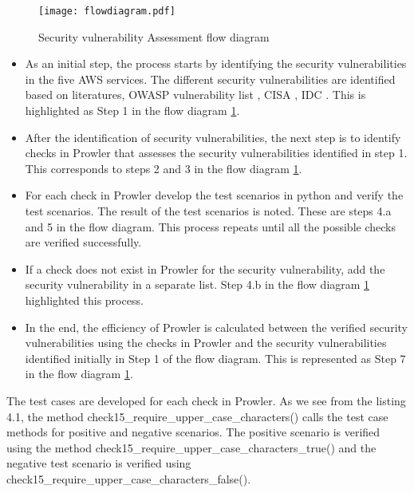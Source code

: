 \begin{figure}
    \centering
    \texttt{[image: flowdiagram.pdf]}
    \caption{Security vulnerability Assessment flow diagram}
    \label{fig:flowdiagram}
\end{figure}
\begin{itemize}
    \item As an initial step, the process starts by identifying the security vulnerabilities in the five AWS services.
    The different security vulnerabilities are identified based on literatures, OWASP vulnerability list \cite{43}, CISA \cite{42}, IDC \cite{41}.
    This is highlighted as Step 1 in the flow diagram \ref{fig:flowdiagram}.
\end{itemize}
\begin{itemize}
    \item After the identification of security vulnerabilities, the next step is to identify checks in Prowler that assesses the security vulnerabilities identified in step 1.
    This corresponds to steps 2 and 3 in the flow diagram \ref{fig:flowdiagram}.
\end{itemize}
\begin{itemize}
    \item For each check in Prowler develop the test scenarios in python and verify the test scenarios. The result of the test scenarios is noted. These are steps 4.a and 5 in the flow diagram. This process repeats until all the possible checks are verified successfully.
\end{itemize}
\begin{itemize}
    \item If a check does not exist in Prowler for the security vulnerability, add the security vulnerability in a separate list.
    Step 4.b in the flow diagram \ref{fig:flowdiagram} highlighted this process.
\end{itemize}
\begin{itemize}
    \item In the end, the efficiency of Prowler is calculated between the verified security vulnerabilities using the checks in Prowler and the security vulnerabilities identified initially in Step 1 of the flow diagram.
    This is represented as Step 7 in the flow diagram \ref{fig:flowdiagram}.
\end{itemize}


\par The test cases are developed for each check in Prowler.
As we see from the listing
4.1, the method check15\_require\_upper\_case\_characters() calls the test case methods
for positive and negative scenarios.
The positive scenario is verified using the method
check15\_require\_upper\_case\_characters\_true() and the negative test scenario is verified
using check15\_require\_upper\_case\_characters\_false().

